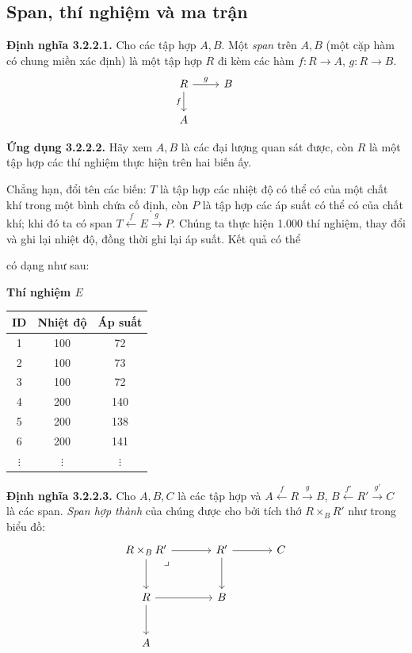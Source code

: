 \subsection{Span, thí nghiệm và ma trận}
\noindent\textbf{Định nghĩa 3.2.2.1.} Cho các tập hợp $A,B$. Một \emph{span} trên $A,B$ (một cặp hàm có chung miền xác định) là một tập hợp $R$ đi kèm các hàm $f:R\to A$, $g:R\to B$.
\[\begin{tikzcd}R\arrow[r,"g"]\arrow[d,"f"']&B\\A&\end{tikzcd}\]

\noindent\textbf{Ứng dụng 3.2.2.2.} Hãy xem $A,B$ là các đại lượng quan sát được, còn $R$ là một tập hợp các thí nghiệm thực hiện trên hai biến ấy.

Chẳng hạn, đổi tên các biến: $T$ là tập hợp các nhiệt độ có thể có của một chất khí trong một bình chứa cố định, còn $P$ là tập hợp các áp suất có thể có của chất khí; khi đó ta có span $T\xleftarrow{f}E\xrightarrow{g}P$. Chúng ta thực hiện 1.000 thí nghiệm, thay đổi và ghi lại nhiệt độ, đồng thời ghi lại áp suất. Kết quả có thể

có dạng như sau:
\begin{center}\begin{minipage}{\linewidth}\centering\textbf{Thí nghiệm $E$}\\\begin{tabular}{ccc}\toprule ID&Nhiệt độ&Áp suất\\\midrule1&100&72\\2&100&73\\3&100&72\\4&200&140\\5&200&138\\6&200&141\\$\vdots$&$\vdots$&$\vdots$\\\bottomrule\end{tabular}\end{minipage}\end{center}

\noindent\textbf{Định nghĩa 3.2.2.3.} Cho $A,B,C$ là các tập hợp và $A\xleftarrow{f}R\xrightarrow{g}B$, $B\xleftarrow{f'}R'\xrightarrow{g'}C$ là các span. \emph{Span hợp thành} của chúng được cho bởi tích thớ $R\times_BR'$ như trong biểu đồ:
\[\begin{tikzcd}[column sep=large,row sep=large]
R\times_BR'\arrow[r]\arrow[d]\arrow[dr,phantom,"\lrcorner",very near start]&R'\arrow[r]\arrow[d]&C\\
R\arrow[r]\arrow[d]&B&\\ A&&
\end{tikzcd}\]

